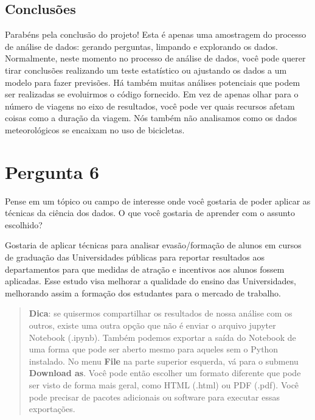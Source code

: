 \documentclass[11pt]{article}
\begin{document}
    \subsection{Conclusões}\label{conclusuxf5es}

Parabéns pela conclusão do projeto! Esta é apenas uma amostragem do
processo de análise de dados: gerando perguntas, limpando e explorando
os dados. Normalmente, neste momento no processo de análise de dados,
você pode querer tirar conclusões realizando um teste estatístico ou
ajustando os dados a um modelo para fazer previsões. Há também muitas
análises potenciais que podem ser realizadas se evoluirmos o código
fornecido. Em vez de apenas olhar para o número de viagens no eixo de
resultados, você pode ver quais recursos afetam coisas como a duração da
viagem. Nós também não analisamos como os dados meteorológicos se
encaixam no uso de bicicletas.

    \section{Pergunta 6}\label{pergunta-6}

Pense em um tópico ou campo de interesse onde você gostaria de poder
aplicar as técnicas da ciência dos dados. O que você gostaria de
aprender com o assunto escolhido?

Gostaria de aplicar técnicas para analisar evasão/formação de alunos em
cursos de graduação das Universidades públicas para reportar resultados
aos departamentos para que medidas de atração e incentivos aos alunos
fossem aplicadas. Esse estudo visa melhorar a qualidade do ensino das
Universidades, melhorando assim a formação dos estudantes para o mercado
de trabalho.

    \begin{quote}
\textbf{Dica}: se quisermos compartilhar os resultados de nossa análise
com os outros, existe uma outra opção que não é enviar o arquivo jupyter
Notebook (.ipynb). Também podemos exportar a saída do Notebook de uma
forma que pode ser aberto mesmo para aqueles sem o Python instalado. No
menu \textbf{File} na parte superior esquerda, vá para o submenu
\textbf{Download as}. Você pode então escolher um formato diferente que
pode ser visto de forma mais geral, como HTML (.html) ou PDF (.pdf).
Você pode precisar de pacotes adicionais ou software para executar essas
exportações.
\end{quote}


    
    
    
    
\end{document}
